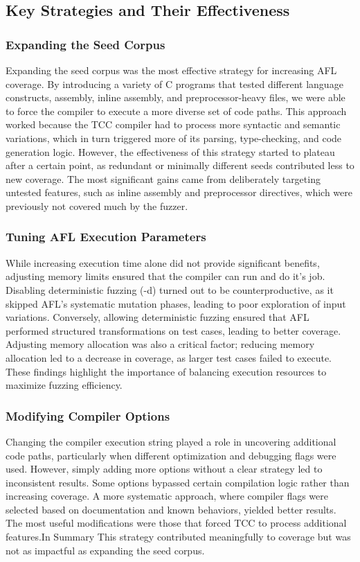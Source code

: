 \documentclass[conference]{IEEEtran}
\begin{document}
\subsection{Key Strategies and Their Effectiveness}

\subsubsection{Expanding the Seed Corpus}
Expanding the seed corpus was the most effective strategy for increasing AFL coverage. By introducing a variety of C programs that tested different language constructs, assembly, inline assembly, and preprocessor-heavy files, we were able to force the compiler to execute a more diverse set of code paths. This approach worked because the TCC compiler had to process more syntactic and semantic variations, which in turn triggered more of its parsing, type-checking, and code generation logic. However, the effectiveness of this strategy started to plateau after a certain point, as redundant or minimally different seeds contributed less to new coverage. The most significant gains came from deliberately targeting untested features, such as inline assembly and preprocessor directives, which were previously not covered much by the fuzzer.

\subsubsection{Tuning AFL Execution Parameters}
While increasing execution time alone did not provide significant benefits, adjusting memory limits ensured that the compiler can run and do it's job. Disabling deterministic fuzzing (-d) turned out to be counterproductive, as it skipped AFL's systematic mutation phases, leading to poor exploration of input variations. Conversely, allowing deterministic fuzzing ensured that AFL performed structured transformations on test cases, leading to better coverage. Adjusting memory allocation was also a critical factor; reducing memory allocation led to a decrease in coverage, as larger test cases failed to execute. These findings highlight the importance of balancing execution resources to maximize fuzzing efficiency.

\subsubsection{Modifying Compiler Options}
Changing the compiler execution string played a role in uncovering additional code paths, particularly when different optimization and debugging flags were used. However, simply adding more options without a clear strategy led to inconsistent results. Some options bypassed certain compilation logic rather than increasing coverage. A more systematic approach, where compiler flags were selected based on documentation and known behaviors, yielded better results. The most useful modifications were those that forced TCC to process additional features.In Summary This strategy contributed meaningfully to coverage but was not as impactful as expanding the seed corpus.
\end{document}
